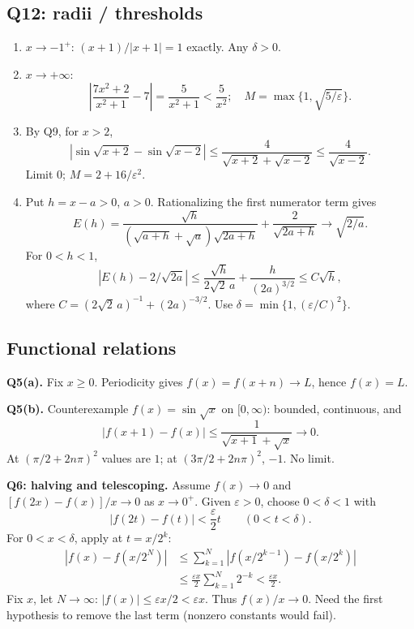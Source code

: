 \documentclass[11pt,letterpaper]{article}
\begin{document}
\subsection{Q12: radii / thresholds}\label{q12-radii-thresholds}

\begin{enumerate}
\def\labelenumi{(\alph{enumi})}
\item
  \(x\to-1^+\): \((x+1)/|x+1|=1\) exactly. Any \(\delta>0\).
\item
  \(x\to+\infty\): \[
  \left|\frac{7x^2+2}{x^2+1}-7\right|=\frac5{x^2+1}<\frac5{x^2};\quad
  M=\max\{1,\sqrt{5/\varepsilon}\}.
  \]
\item
  By Q9, for \(x>2\), \[
  |\sin\sqrt{x+2}-\sin\sqrt{x-2}|
  \le\frac4{\sqrt{x+2}+\sqrt{x-2}}\le\frac4{\sqrt{x-2}}.
  \] Limit \(0\); \(M=2+16/\varepsilon^2\).
\item
  Put \(h=x-a>0\), \(a>0\). Rationalizing the first numerator term gives
  \[
  E(h)=\frac{\sqrt h}{(\sqrt{a+h}+\sqrt a)\sqrt{2a+h}}
  +\frac2{\sqrt{2a+h}}\to\sqrt{2/a}.
  \] For \(0<h<1\), \[
  |E(h)-2/\sqrt{2a}|\le\frac{\sqrt h}{2\sqrt2\,a}+\frac{h}{(2a)^{3/2}}
  \le C\sqrt h,
  \] where \(C=(2\sqrt2\,a)^{-1}+(2a)^{-3/2}\). Use
  \(\delta=\min\{1,(\varepsilon/C)^2\}\).
\end{enumerate}

\subsection{Functional relations}\label{functional-relations}

\textbf{Q5(a).} Fix \(x\ge0\). Periodicity gives \(f(x)=f(x+n)\to L\),
hence \(f(x)=L\).

\textbf{Q5(b).} Counterexample \(f(x)=\sin\sqrt x\) on \([0,\infty)\):
bounded, continuous, and \[
|f(x+1)-f(x)|\le\frac1{\sqrt{x+1}+\sqrt x}\to0.
\] At \((\pi/2+2n\pi)^2\) values are \(1\); at \((3\pi/2+2n\pi)^2\),
\(-1\). No limit.

\textbf{Q6: halving and telescoping.} Assume \(f(x)\to0\) and
\([f(2x)-f(x)]/x\to0\) as \(x\to0^+\). Given \(\varepsilon>0\), choose
\(0<\delta<1\) with \[
|f(2t)-f(t)|<\frac\varepsilon2t\qquad(0<t<\delta).
\] For \(0<x<\delta\), apply at \(t=x/2^k\): \[
\begin{aligned}
|f(x)-f(x/2^N)|
&\le\sum_{k=1}^N|f(x/2^{k-1})-f(x/2^k)|\\
&\le\frac{\varepsilon x}2\sum_{k=1}^N2^{-k}<\frac{\varepsilon x}2.
\end{aligned}
\] Fix \(x\), let \(N\to\infty\):
\(|f(x)|\le\varepsilon x/2<\varepsilon x\). Thus \(f(x)/x\to0\). Need
the first hypothesis to remove the last term (nonzero constants would
fail).
\end{document}
